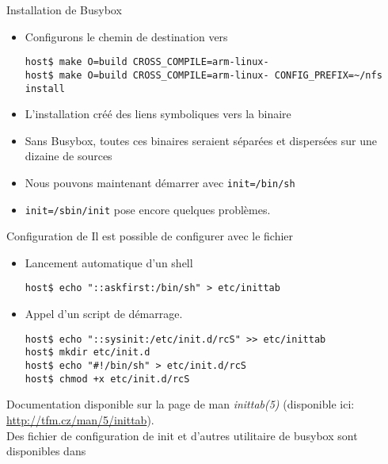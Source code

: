 \begin{frame}[fragile=singleslide]{Installation de Busybox}
  \begin{itemize}
  \item Configurons le chemin de destination vers 
    \begin{lstlisting}
host$ make O=build CROSS_COMPILE=arm-linux-
host$ make O=build CROSS_COMPILE=arm-linux- CONFIG_PREFIX=~/nfs install
    \end{lstlisting}
  \item  L'installation créé  des  liens symboliques  vers la  binaire
  \item  Sans  Busybox,  toutes  ces  binaires  seraient  séparées  et
    dispersées sur une dizaine de sources
  \item Nous pouvons maintenant démarrer avec \verb+init=/bin/sh+
  \item \verb+init=/sbin/init+ pose encore quelques problèmes.
  \end{itemize}
\end{frame}

\begin{frame}[fragile=singleslide]{Configuration de }
  Il est possible de configurer  avec le fichier
  \begin{itemize}
  \item Lancement automatique d'un shell
    \begin{lstlisting}
host$ echo "::askfirst:/bin/sh" > etc/inittab
    \end{lstlisting}
  \item Appel d'un script de démarrage.
    \begin{lstlisting}
host$ echo "::sysinit:/etc/init.d/rcS" >> etc/inittab
host$ mkdir etc/init.d
host$ echo "#!/bin/sh" > etc/init.d/rcS
host$ chmod +x etc/init.d/rcS
    \end{lstlisting}
  \end{itemize}
  Documentation disponible sur la page de man \emph{inittab(5)}
  (disponible ici: \url{http://tfm.cz/man/5/inittab}).\\[2ex]
  Des  fichier de  configuration  de init  et  d'autres utilitaire  de
  busybox sont disponibles dans 
\end{frame}


